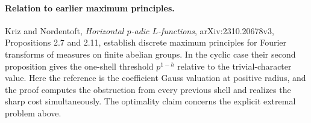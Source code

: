 \paragraph{Relation to earlier maximum principles.}
Kriz and Nordentoft, \emph{Horizontal $p$-adic $L$-functions},
arXiv:2310.20678v3, Propositions 2.7 and 2.11, establish discrete maximum
principles for Fourier transforms of measures on finite abelian groups.
In the cyclic case their second proposition gives the one-shell threshold
$p^{1-h}$ relative to the trivial-character value. Here the reference
is the coefficient Gauss valuation at positive radius, and the proof
computes the obstruction from every previous shell and realizes the
sharp cost simultaneously. The optimality claim concerns the explicit
extremal problem above.   
